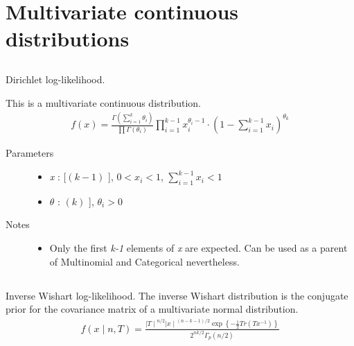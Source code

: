 \documentclass[]{jss}
\begin{document}

\section{Multivariate continuous distributions} %

\subsection[Dirichlet]{ }


Dirichlet log-likelihood.

This is a multivariate continuous distribution.
\begin{eqnarray*}
f(x) = \frac{\Gamma(\sum_{i=1}^k \theta_i)}{\prod \Gamma(\theta_i)}\prod_{i=1}^{k-1} x_i^{\theta_i - 1}\cdot\left(1-\sum_{i=1}^{k-1}x_i\right)^{\theta_k}    
\end{eqnarray*}
\begin{description}
\item[Parameters] \leavevmode\begin{itemize}
\item{}
\emph{x} : {[}$(k-1)$ {]}, $0 < x_i < 1$,  $\sum_{i=1}^{k-1} x_i < 1$
\item{}
$\theta$ : \leavevmode{[}$(k)$ {]}, $\theta_i> 0$

\end{itemize}

\item[Notes]\leavevmode \begin{itemize}
    \item {}
    Only the first \emph{k-1} elements of \emph{x} are expected. Can be used as a parent of Multinomial and Categorical
    nevertheless.    
\end{itemize}

\end{description}


\subsection[inverse Wishart]{ }

Inverse Wishart log-likelihood. The inverse Wishart distribution is the conjugate
prior for the covariance matrix of a multivariate normal distribution.
\begin{eqnarray*}
f(x \mid n, T) = \frac{{\mid T \mid}^{n/2}{\mid x \mid}^{(n-k-1)/2} \exp\left\{ -\frac{1}{2} Tr(Tx^{-1}) \right\}}{2^{nk/2} \Gamma_p(n/2)}    
\end{eqnarray*}
\end{document}
